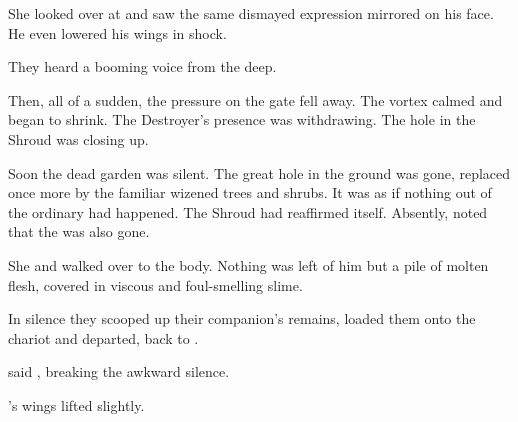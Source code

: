 
She looked over at \Ganethed and saw the same dismayed expression mirrored on his face. 
He even lowered his wings in shock. 

They heard a booming voice from the deep. 


Then, all of a sudden, the pressure on the gate fell away. 
The vortex calmed and began to shrink. 
The Destroyer's presence was withdrawing.
The hole in the Shroud was closing up. 


Soon the dead garden was silent. 
The great hole in the ground was gone, replaced once more by the familiar wizened trees and shrubs. 
It was as if nothing out of the ordinary had happened.
The Shroud had reaffirmed itself. 
Absently, \Achsah noted that the \scatha was also gone. 

She and \Ganethed walked over to the body. 
Nothing was left of him but a pile of molten flesh, covered in viscous and foul-smelling slime.


In silence they scooped up their companion's remains, loaded them onto the chariot and departed, back to \Nyx. 

 said \Achsah, breaking the awkward silence. 

\Ganethed's wings lifted slightly. 

